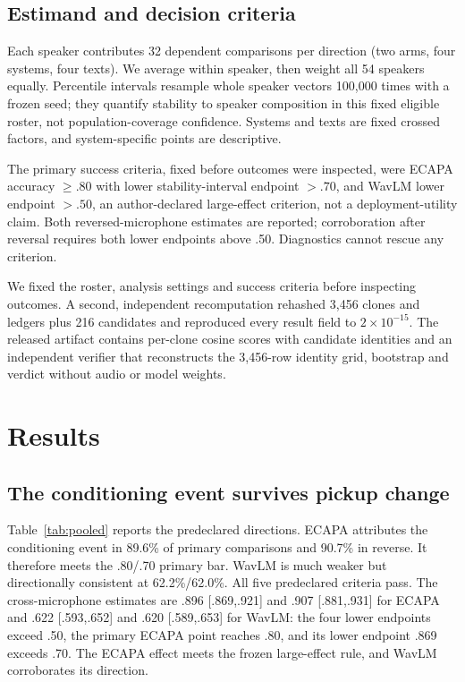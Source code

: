 \documentclass[10pt,twocolumn,letterpaper]{article}
\begin{document}
\subsection{Estimand and decision criteria}
Each speaker contributes 32 dependent comparisons per direction (two arms,
four systems, four texts). We average within speaker, then weight all 54
speakers equally. Percentile intervals resample whole speaker vectors 100,000
times with a frozen seed; they quantify stability to speaker composition in
this fixed eligible roster, not population-coverage confidence. Systems and
texts are fixed crossed factors, and system-specific points are descriptive.

The primary success criteria, fixed before outcomes were inspected, were ECAPA
accuracy $\geq.80$ with lower stability-interval endpoint $>.70$, and WavLM
lower endpoint $>.50$, an author-declared large-effect criterion, not a
deployment-utility claim. Both reversed-microphone estimates are reported;
corroboration after reversal requires both lower endpoints above .50.
Diagnostics cannot rescue any criterion.

We fixed the roster, analysis settings and success criteria before inspecting
outcomes. A second, independent
recomputation rehashed 3,456 clones and ledgers plus 216 candidates and
reproduced every result field to $2\times10^{-15}$. The released artifact
contains per-clone cosine scores with candidate identities and an independent
verifier that reconstructs the 3,456-row identity
grid, bootstrap and verdict without audio or model weights.

\section{Results}
\subsection{The conditioning event survives pickup change}
Table~\ref{tab:pooled} reports the predeclared directions. ECAPA attributes the
conditioning event in 89.6\% of primary comparisons and 90.7\% in reverse. It
therefore meets the .80/.70 primary bar. WavLM is much weaker but directionally
consistent at 62.2\%/62.0\%. All five predeclared criteria pass. The
cross-microphone estimates are .896 [.869,.921] and .907 [.881,.931] for ECAPA
and .622 [.593,.652] and .620 [.589,.653] for WavLM: the four lower endpoints
exceed .50, the primary ECAPA point reaches .80, and its lower endpoint .869
exceeds .70. The ECAPA effect meets the frozen large-effect rule, and WavLM
corroborates its direction.
\end{document}
